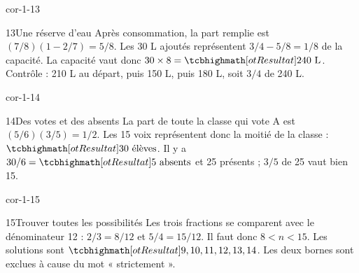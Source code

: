 \begin{blocLivre}{cor-1-13}\begin{corrige}{13}{Une réserve d’eau}
Après consommation, la part remplie est $(7/8)(1-2/7)=5/8$. Les 30 L ajoutés représentent $3/4-5/8=1/8$ de la capacité. La capacité vaut donc $30\times8=\res{240\text{ L}}$. Contrôle : 210 L au départ, puis 150 L, puis 180 L, soit $3/4$ de 240 L.
\end{corrige}\end{blocLivre}
\begin{blocLivre}{cor-1-14}\begin{corrige}{14}{Des votes et des absents}
La part de toute la classe qui vote A est $(5/6)(3/5)=1/2$. Les 15 voix représentent donc la moitié de la classe : $\res{30\text{ élèves}}$. Il y a $30/6=\res{5\text{ absents}}$ et 25 présents ; $3/5$ de 25 vaut bien 15.
\end{corrige}\end{blocLivre}
\begin{blocLivre}{cor-1-15}\begin{corrige}{15}{Trouver toutes les possibilités}
Les trois fractions se comparent avec le dénominateur 12 : $2/3=8/12$ et $5/4=15/12$. Il faut donc $8<n<15$. Les solutions sont $\res{9,10,11,12,13,14}$. Les deux bornes sont exclues à cause du mot « strictement ».
\end{corrige}\end{blocLivre}
